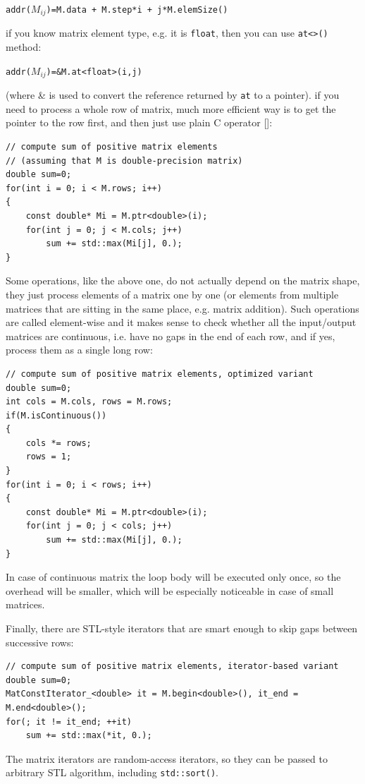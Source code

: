 \texttt{addr($M_{ij}$)=M.data + M.step*i + j*M.elemSize()}


if you know matrix element type, e.g. it is \texttt{float}, then you can use \texttt{at<>()} method:


\texttt{addr($M_{ij}$)=\&M.at<float>(i,j)}

(where \& is used to convert the reference returned by \texttt{at} to a pointer).
if you need to process a whole row of matrix, much more efficient way is to get the pointer to the row first, and then just use plain C operator []:

\begin{lstlisting}
// compute sum of positive matrix elements
// (assuming that M is double-precision matrix)
double sum=0;
for(int i = 0; i < M.rows; i++)
{
    const double* Mi = M.ptr<double>(i);
    for(int j = 0; j < M.cols; j++)
        sum += std::max(Mi[j], 0.);
}
\end{lstlisting}

Some operations, like the above one, do not actually depend on the matrix shape, they just process elements of a matrix one by one (or elements from multiple matrices that are sitting in the same place, e.g. matrix addition). Such operations are called element-wise and it makes sense to check whether all the input/output matrices are continuous, i.e. have no gaps in the end of each row, and if yes, process them as a single long row:

\begin{lstlisting}
// compute sum of positive matrix elements, optimized variant
double sum=0;
int cols = M.cols, rows = M.rows;
if(M.isContinuous())
{
    cols *= rows;
    rows = 1;
}
for(int i = 0; i < rows; i++)
{
    const double* Mi = M.ptr<double>(i);
    for(int j = 0; j < cols; j++)
        sum += std::max(Mi[j], 0.);
}
\end{lstlisting}
In case of continuous matrix the loop body will be executed only once, so the overhead will be smaller, which will be especially noticeable in case of small matrices.

Finally, there are STL-style iterators that are smart enough to skip gaps between successive rows:
\begin{lstlisting}
// compute sum of positive matrix elements, iterator-based variant
double sum=0;
MatConstIterator_<double> it = M.begin<double>(), it_end = M.end<double>();
for(; it != it_end; ++it)
    sum += std::max(*it, 0.);
\end{lstlisting}

The matrix iterators are random-access iterators, so they can be passed to arbitrary STL algorithm, including \texttt{std::sort()}.

